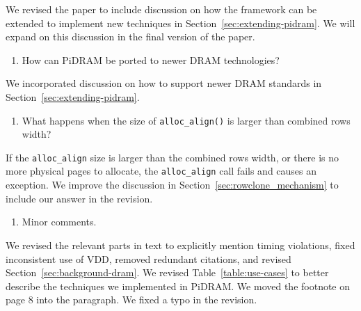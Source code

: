 We revised the paper to include discussion on how the framework can be extended to implement new techniques in Section~\ref{sec:extending-pidram}. We will expand on this discussion in the final version of the paper.

\bigbreak
\begin{tcolorbox}
    \begin{enumerate}[label=R5/\arabic*]
        \addtocounter{enumi}{3}
        \item \label{q:r5q4} How can PiDRAM be ported to newer DRAM technologies?
    \end{enumerate}
\end{tcolorbox} 

We incorporated discussion on how to support newer DRAM standards in Section~\ref{sec:extending-pidram}.

\bigbreak
\begin{tcolorbox}
    \begin{enumerate}[label=R5/\arabic*]
        \addtocounter{enumi}{4}
        \item \label{q:r5q5} What happens when the size of \texttt{alloc\_align()} is larger than combined rows width? 
    \end{enumerate}
\end{tcolorbox} 

If the \texttt{alloc\_align} size is larger than the combined rows width, or there is no more physical pages to allocate, the \texttt{alloc\_align} call fails and causes an exception. We improve the discussion in Section~\ref{sec:rowclone_mechanism} to include our answer in the revision.

\bigbreak
\begin{tcolorbox}
    \begin{enumerate}[label=R5/\arabic*]
        \addtocounter{enumi}{5}
        \item \label{q:r5q6} Minor comments.
    \end{enumerate}
\end{tcolorbox} 

We revised the relevant parts in text to explicitly mention timing violations, fixed inconsistent use of VDD, removed redundant citations, and revised Section~\ref{sec:background-dram}. We revised Table~\ref{table:use-cases} to better describe the techniques we implemented in PiDRAM. We moved the footnote on page 8 into the paragraph. We fixed a typo in the revision.




